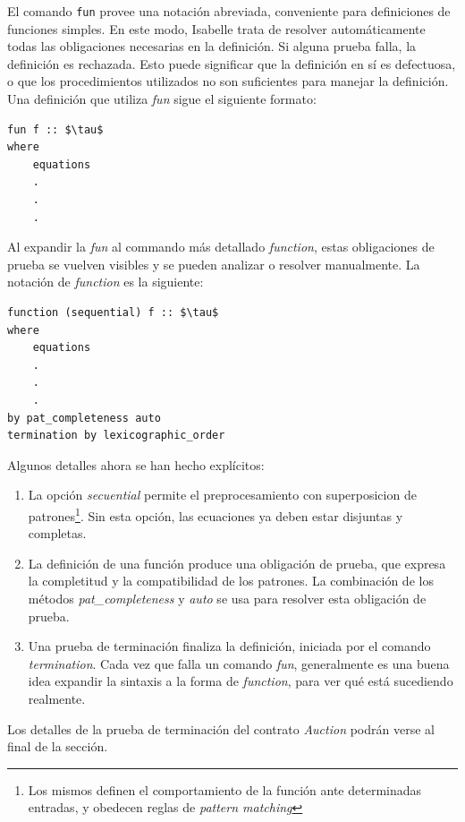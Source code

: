 \documentclass[12pt]{book}
\begin{document}
El comando \texttt{fun} provee una notación abreviada, conveniente para definiciones de funciones simples. En este modo, Isabelle trata de resolver automáticamente todas las obligaciones necesarias en la definición. Si alguna prueba falla, la definición es rechazada. Esto puede significar que la definición en sí es defectuosa, o que los procedimientos utilizados no son suficientes para manejar la definición. Una definición que utiliza \textit{fun} sigue el siguiente formato:

\begin{lstlisting}[style=Isabelle, caption=Definición de una función mediante \textit{fun}]
fun f :: $\tau$
where
    equations
    .
    .
    .
\end{lstlisting}

Al expandir la \textit{fun} al commando más detallado \textit{function}, estas obligaciones de prueba se vuelven visibles y se pueden analizar o resolver manualmente. La notación de \textit{function} es la siguiente:

\begin{lstlisting}[style=Isabelle]
function (sequential) f :: $\tau$
where
    equations
    .
    .
    .
by pat_completeness auto
termination by lexicographic_order
\end{lstlisting}

Algunos detalles ahora se han hecho explícitos:
\begin{enumerate}
    \item La opción \textit{secuential} permite el preprocesamiento con superposicion de patrones\footnote{Los mismos definen el comportamiento de la función ante determinadas entradas, y obedecen reglas de \textit{pattern matching}}. Sin esta opción, las ecuaciones ya deben estar disjuntas y completas.
    \item La definición de una función produce una obligación de prueba, que expresa la completitud y la compatibilidad de los patrones. La combinación de los métodos \textit{pat\_completeness} y \textit{auto} se usa para resolver esta obligación de prueba.
    \item Una prueba de terminación finaliza la definición, iniciada por el comando \textit{termination}. Cada vez que falla un comando \textit{fun}, generalmente es una buena idea expandir la sintaxis a la forma de \textit{function}, para ver qué está sucediendo realmente.
\end{enumerate}

Los detalles de la prueba de terminación del contrato \textit{Auction} podrán verse al final de la sección.
\end{document}
